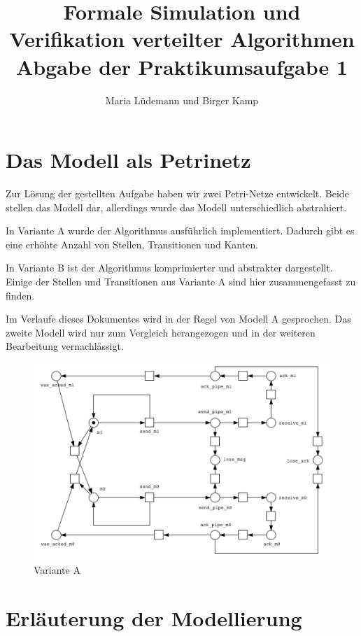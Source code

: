 \documentclass[]{scrartcl}
\title{Formale Simulation und Verifikation verteilter Algorithmen  \\ Abgabe der Praktikumsaufgabe 1}
\author{Maria Lüdemann und Birger Kamp}
\begin{document}
\maketitle

\begin{abstract}

\end{abstract}

\section{Das Modell als Petrinetz}
Zur Lösung der gestellten Aufgabe haben wir zwei Petri-Netze entwickelt. Beide stellen das Modell dar, allerdings wurde das Modell unterschiedlich abstrahiert.

In Variante A wurde der Algorithmus ausführlich implementiert. Dadurch gibt es eine erhöhte Anzahl von Stellen, Transitionen und Kanten.

In Variante B ist der Algorithmus komprimierter und abstrakter dargestellt. Einige der Stellen und Transitionen aus Variante A sind hier zusammengefasst zu finden.

Im Verlaufe dieses Dokumentes wird in der Regel von Modell A gesprochen. Das zweite Modell wird nur zum Vergleich herangezogen und in der weiteren Bearbeitung vernachlässigt.

\begin{figure}[H]
	\centering
	\includegraphics[width=0.7\linewidth]{petrinet.png}
	\caption{Variante A}
	\label{fig:petri_net_A}
\end{figure}




\section{Erläuterung der Modellierung}
\end{document}
